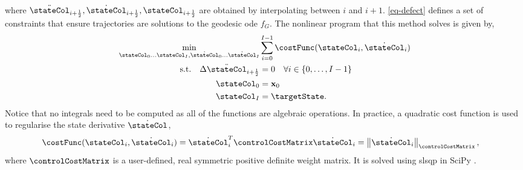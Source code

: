 \documentclass{mimosis-class/mimosis}
\numberwithin{equation}{chapter}
\newcommand{\state}{\ensuremath{\mathbf{x}}}
\begin{document}
{\begin{align}
\end{align}
where \(\ddot{\stateCol}_{i+\frac{1}{2}}, \dot{\stateCol}_{i+\frac{1}{2}}, \stateCol_{i+\frac{1}{2}}\)
are obtained by interpolating between \(i\) and \(i+1\).
\cref{eq-defect} defines a set of constraints that ensure trajectories are solutions
to the geodesic \acrshort{ode} \(f_G\).
The nonlinear program that this method solves is given by,
\begin{subequations} \label{eq-collocation-problem}
\begin{align}
\min_{\stateCol_0 \ldots \stateCol_I, \dot{\stateCol}_0 \ldots \dot{\stateCol}_I}& \sum_{i=0}^{I-1}
\costFunc(\stateCol_i, \dot{\stateCol}_i ) \\
\text{s.t.} \quad
\Delta\ddot{\stateCol}_{i+\frac{1}{2}} &= 0 \quad \forall i \in \{0, \ldots, I-1\} \\
\stateCol_0 &= \state_0 \\
\stateCol_I &= \targetState.
\end{align}
\end{subequations}
Notice that no integrals need to be computed as all of the functions are algebraic operations.
In practice, a quadratic cost function is used to regularise the state derivative \(\dot{\stateCol}\),
\begin{align} \label{eq-quadratic-cost-state-derivative}
\costFunc(\stateCol_i, \dot{\stateCol}_i)
&= \dot{\stateCol}_i^T \controlCostMatrix \dot{\stateCol}_i
= \left\| \dot{\stateCol}_i \right\|_{\controlCostMatrix},
\end{align}
where \(\controlCostMatrix\) is a user-defined, real symmetric positive definite weight matrix.
It is solved using \acrfull{slsqp} in SciPy \citep{2020SciPy-NMeth}.

}
\end{document}
